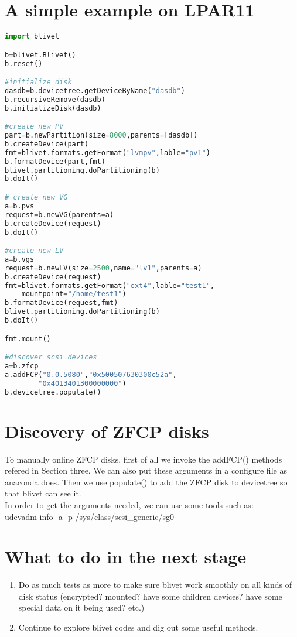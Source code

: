 \documentclass{article}
\begin{document}
\section{A simple example on LPAR11}

\begin{lstlisting}[language=python]
import blivet

b=blivet.Blivet()
b.reset()

#initialize disk
dasdb=b.devicetree.getDeviceByName("dasdb")
b.recursiveRemove(dasdb)
b.initializeDisk(dasdb)

#create new PV
part=b.newPartition(size=8000,parents=[dasdb])
b.createDevice(part)
fmt=blivet.formats.getFormat("lvmpv",lable="pv1")
b.formatDevice(part,fmt)
blivet.partitioning.doPartitioning(b)
b.doIt()

# create new VG
a=b.pvs
request=b.newVG(parents=a)
b.createDevice(request)
b.doIt()

#create new LV
a=b.vgs
request=b.newLV(size=2500,name="lv1",parents=a)
b.createDevice(request)
fmt=blivet.formats.getFormat("ext4",lable="test1",
    mountpoint="/home/test1")
b.formatDevice(request,fmt)
blivet.partitioning.doPartitioning(b)
b.doIt()

fmt.mount()

#discover scsi devices
a=b.zfcp
a.addFCP("0.0.5080","0x500507630300c52a",
		"0x4013401300000000")
b.devicetree.populate()
\end{lstlisting}
\section{Discovery of ZFCP disks}
To manually online ZFCP disks, first of all we invoke the addFCP() methods refered
in Section three. We can also put these arguments in a configure file as anaconda
does. Then we use populate() to add the ZFCP disk to devicetree so that blivet
can see it.\\
\newline
In order to get the arguments needed, we can use some tools such as: \\
udevadm info -a -p /sys/class/scsi\_generic/sg0
\section{What to do in the next stage}
\begin{enumerate}
\item Do as much tests as more to make sure blivet work smoothly on all kinds of
disk status (encrypted?  mounted? have some children devices? have some special
data on it being used?  etc.)
\item Continue to explore blivet codes and dig out some useful methods.
\end{enumerate}
\end{document}
